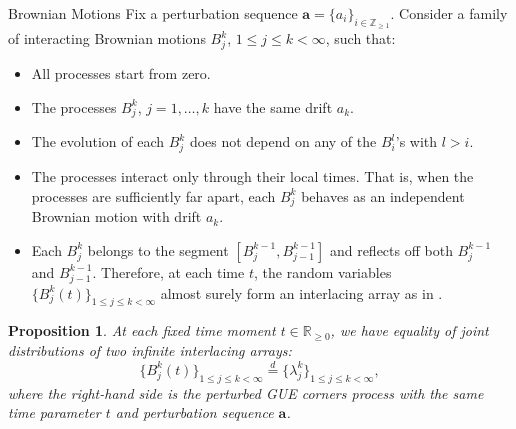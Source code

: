\documentclass[english,final,t]{beamer}
\newtheorem{proposition}{Proposition}[section]
\begin{document}
\begin{frame}{}
\begin{columns}[t]
\begin{column}{.26\linewidth}
\begin{block}{Brownian Motions}
Fix a perturbation sequence $\mathbf{a}=\{a_i \}_{i\in \mathbb{Z}_{\ge1}}$.
Consider a family of interacting Brownian motions 
$B^k_j$, $1\le j\le k<\infty$, such that:
\begin{itemize}
	\item All processes start from zero.
	\item The processes $B^k_j$, $j=1,\ldots,k $
		have the same drift $a_k$.
	\item The evolution of each $B^k_j$
		does not depend on any of the $B^l_i$'s with $l>i$.
	\item The processes interact only through their local times.
		That is, when the processes are sufficiently far apart,
		each $B^k_j$ behaves as an independent Brownian motion 
		with drift $a_k$.
	\item Each $B^k_j$ belongs to the segment
		$[B^{k-1}_j,B^{k-1}_{j-1}]$
		and reflects off 
		both 
		$B^{k-1}_j$ and $B^{k-1}_{j-1}$.
		Therefore, at each time $t$, the 
		random variables
		$\{B^k_j(t)\}_{1\le j\le k<\infty}$ almost surely form
		an interlacing array as in .
\end{itemize}
\end{block}
\begin{proposition}
	\label{prop:connection_to_reflected_BM}
	At each fixed time moment $t\in \mathbb{R}_{\ge0}$, we have equality
	of joint distributions of two infinite interlacing arrays:
	\begin{equation*}
		\{B^k_j(t)\}_{1\le j\le k<\infty}
		\stackrel{d}{=}
		\{\lambda^k_j\}_{1\le j\le k<\infty},
	\end{equation*}
	where the right-hand side is the perturbed GUE
	corners process with the same time parameter $t$
	and perturbation sequence $\mathbf{a}$.
\end{proposition}

        \end{column}


\end{columns}
\end{frame}
\end{document}
